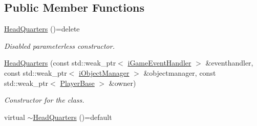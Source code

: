 \subsection*{Public Member Functions}
\begin{DoxyCompactItemize}
\item 
\hypertarget{class_course_1_1_head_quarters_a117d344b8498b5fee8da099d5f3c06a5}{\hyperlink{class_course_1_1_head_quarters_a117d344b8498b5fee8da099d5f3c06a5}{Head\-Quarters} ()=delete}\label{class_course_1_1_head_quarters_a117d344b8498b5fee8da099d5f3c06a5}

\begin{DoxyCompactList}\small\item\em Disabled parameterless constructor. \end{DoxyCompactList}\item 
\hyperlink{class_course_1_1_head_quarters_a654ec0a489a6b8c553d1577e8a2c598e}{Head\-Quarters} (const std\-::weak\-\_\-ptr$<$ \hyperlink{class_course_1_1i_game_event_handler}{i\-Game\-Event\-Handler} $>$ \&eventhandler, const std\-::weak\-\_\-ptr$<$ \hyperlink{class_course_1_1i_object_manager}{i\-Object\-Manager} $>$ \&objectmanager, const std\-::weak\-\_\-ptr$<$ \hyperlink{class_course_1_1_player_base}{Player\-Base} $>$ \&owner)
\begin{DoxyCompactList}\small\item\em Constructor for the class. \end{DoxyCompactList}\item 
\hypertarget{class_course_1_1_head_quarters_afb7c412b1d0a4997a90c87940de2eabd}{virtual \hyperlink{class_course_1_1_head_quarters_afb7c412b1d0a4997a90c87940de2eabd}{$\sim$\-Head\-Quarters} ()=default}\label{class_course_1_1_head_quarters_afb7c412b1d0a4997a90c87940de2eabd}


\end{DoxyCompactItemize}
